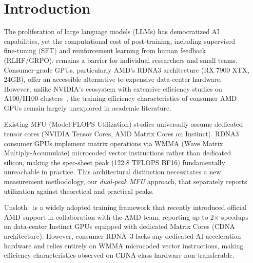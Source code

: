\section{Introduction}
\label{sec:intro}

The proliferation of large language models (LLMs) has democratized AI capabilities, yet the computational cost of post-training, including supervised fine-tuning (SFT) and reinforcement learning from human feedback (RLHF/GRPO), remains a barrier for individual researchers and small teams. Consumer-grade GPUs, particularly AMD's RDNA3 architecture (RX 7900 XTX, 24GB), offer an accessible alternative to expensive data-center hardware. However, unlike NVIDIA's ecosystem with extensive efficiency studies on A100/H100 clusters~\citep{chowdhery2022palm, hoffmann2022chinchilla}, the training efficiency characteristics of consumer AMD GPUs remain largely unexplored in academic literature.

Existing MFU (Model FLOPS Utilization) studies universally assume dedicated tensor cores (NVIDIA Tensor Cores, AMD Matrix Cores on Instinct). RDNA3 consumer GPUs implement matrix operations via WMMA (Wave Matrix Multiply-Accumulate) microcoded vector instructions rather than dedicated silicon, making the spec-sheet peak (122.8 TFLOPS BF16) fundamentally unreachable in practice. This architectural distinction necessitates a new measurement methodology, our \emph{dual-peak MFU} approach, that separately reports utilization against theoretical and practical peaks.

Unsloth~\citep{unsloth2024} is a widely adopted training framework that recently introduced official AMD support in collaboration with the AMD team, reporting up to 2$\times$ speedups on data-center Instinct GPUs equipped with dedicated Matrix Cores (CDNA architecture). However, consumer RDNA~3 lacks any dedicated AI acceleration hardware and relies entirely on WMMA microcoded vector instructions, making efficiency characteristics observed on CDNA-class hardware non-transferable.

